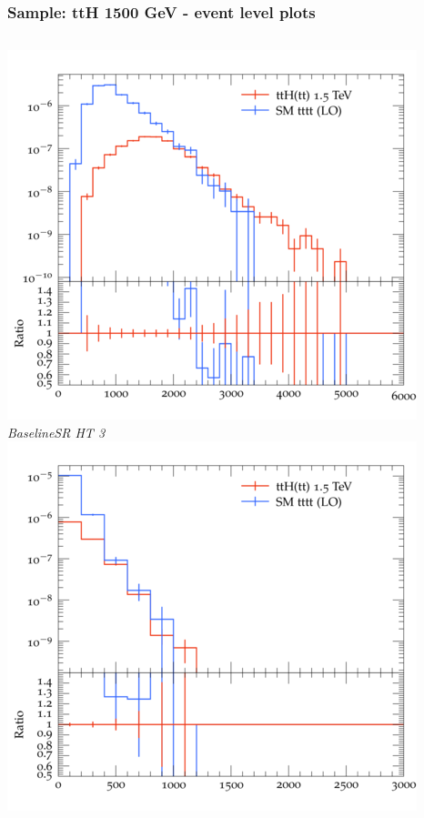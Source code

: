 \documentclass{beamer}
\begin{document}
\begin{frame}
\frametitle{Sample: ttH 1500 GeV - event level plots}
\begin{columns}
\includegraphics[width=\textwidth]{../plots/ttH_1500/tttt_ttH_1LOS/BaselineSR_HT_3.png}\\
\textit{\small BaselineSR HT 3}
\includegraphics[width=\textwidth]{../plots/ttH_1500/tttt_ttH_1LOS/BaselineSR_MET.png}\\

\end{columns}
\end{frame}
\end{document}
